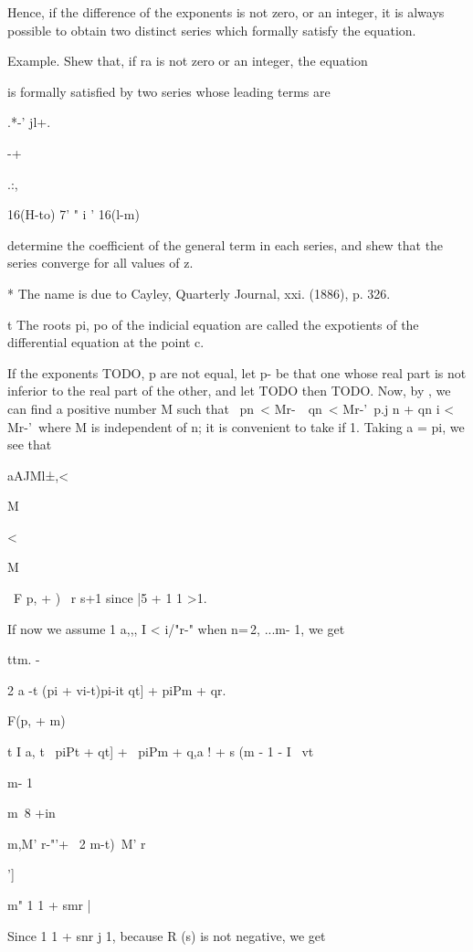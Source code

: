 Hence, if the difference of the exponents is not zero, or an integer,
it is always possible to obtain two distinct series which formally
satisfy the equation.

Example. Shew that, if ra is not zero or an integer, the equation

is formally satisfied by two series whose leading terms are

.*-' jl+.

-+

.:,

16(H-to) 7' " i ' 16(l-m)

determine the coefficient of the general term in each series, and shew
that the series converge for all values of z.

* The name is due to Cayley, Quarterly Journal, xxi. (1886), p. 326.

t The roots pi, po of the indicial equation are called the expotients
of the differential equation at the point c.

%
%


If the exponents TODO, p are not equal, let p- be that one whose real
part is not inferior to the real part of the other, and let
TODO
then
TODO.
Now, by , we can find a positive number M
such that \ pn\ < Mr-\ \ qn\ < Mr-'\ p.j n + qn i < Mr-'\ where M is
independent of n; it is convenient to take if 1. Taking a = pi, we
see that

aAJMl±,<

M

<

M

\ F p, + ) \ r s+1 since |5 + 1 1 >1.

If now we assume 1 a,,, I < i/"r-" when n=\,2, ...m- 1, we get

ttm. -

2 a -t (pi + vi-t)pi-it qt] + piPm + qr.

F(p, + m)

t I a, t \ piPt + qt] + \ piPm + q,a ! + s (m - 1 - I \ vt

m- 1

m\ 8 +in\

m,M' r-"'+ \ 2 m-t)\ M' r

']

m" 1 1 + smr |

Since 1 1 + snr j 1, because R (s) is not negative, we get

